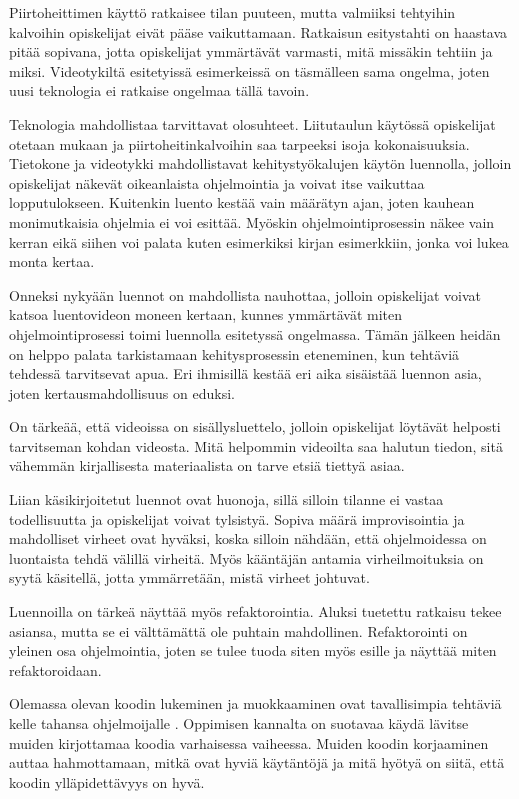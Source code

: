 Piirtoheittimen käyttö ratkaisee tilan puuteen, mutta valmiiksi tehtyihin
kalvoihin opiskelijat eivät pääse vaikuttamaan. Ratkaisun esitystahti on
haastava pitää sopivana, jotta opiskelijat ymmärtävät varmasti, mitä missäkin
tehtiin ja miksi. Videotykiltä esitetyissä esimerkeissä on täsmälleen sama
ongelma, joten uusi teknologia ei ratkaise ongelmaa tällä tavoin.

Teknologia mahdollistaa tarvittavat olosuhteet. Liitutaulun käytössä opiskelijat
otetaan mukaan ja piirtoheitinkalvoihin saa tarpeeksi isoja kokonaisuuksia.
Tietokone ja videotykki mahdollistavat kehitystyökalujen käytön luennolla,
jolloin opiskelijat näkevät oikeanlaista ohjelmointia ja voivat itse vaikuttaa
lopputulokseen. Kuitenkin luento kestää vain määrätyn ajan, joten kauhean
monimutkaisia ohjelmia ei voi esittää. Myöskin ohjelmointiprosessin näkee vain
kerran eikä siihen voi palata kuten esimerkiksi kirjan esimerkkiin, jonka voi
lukea monta kertaa.

Onneksi nykyään luennot on mahdollista nauhottaa, jolloin opiskelijat voivat
katsoa luentovideon moneen kertaan, kunnes ymmärtävät miten ohjelmointiprosessi
toimi luennolla esitetyssä ongelmassa. Tämän jälkeen heidän on helppo palata
tarkistamaan kehitysprosessin eteneminen, kun tehtäviä tehdessä tarvitsevat
apua. Eri ihmisillä kestää eri aika sisäistää luennon asia, joten
kertausmahdollisuus on eduksi.

On tärkeää, että videoissa on sisällysluettelo, jolloin opiskelijat löytävät
helposti tarvitseman kohdan videosta. Mitä helpommin videoilta saa halutun
tiedon, sitä vähemmän kirjallisesta materiaalista on tarve etsiä tiettyä asiaa.

Liian käsikirjoitetut luennot ovat huonoja, sillä silloin tilanne ei vastaa
todellisuutta ja opiskelijat voivat tylsistyä. Sopiva määrä improvisointia ja
mahdolliset virheet ovat hyväksi, koska silloin nähdään, että ohjelmoidessa on
luontaista tehdä välillä virheitä. Myös kääntäjän antamia virheilmoituksia on
syytä käsitellä, jotta ymmärretään, mistä virheet johtuvat.

Luennoilla on tärkeä näyttää myös refaktorointia. Aluksi tuetettu ratkaisu tekee
asiansa, mutta se ei välttämättä ole puhtain mahdollinen. Refaktorointi on
yleinen osa ohjelmointia, joten se tulee tuoda siten myös esille ja näyttää
miten refaktoroidaan.

Olemassa olevan koodin lukeminen ja muokkaaminen ovat tavallisimpia tehtäviä
kelle tahansa ohjelmoijalle \cite{Kolling:2008}. Oppimisen kannalta on suotavaa
käydä lävitse muiden kirjottamaa koodia varhaisessa vaiheessa. Muiden koodin
korjaaminen auttaa hahmottamaan, mitkä ovat hyviä käytäntöjä ja mitä hyötyä on
siitä, että koodin ylläpidettävyys on hyvä.
